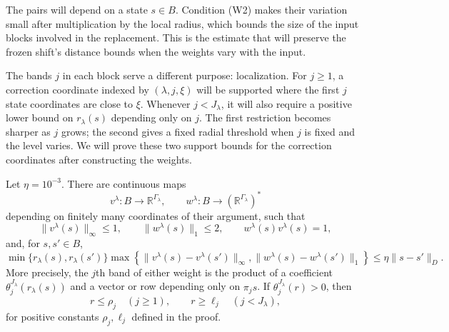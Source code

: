 The pairs will depend on a state $s\in B$. Condition (W2) makes their
variation small after multiplication by the local radius, which bounds
the size of the input blocks involved in the replacement. This is the
estimate that will preserve the frozen shift's distance bounds when
the weights vary with the input.

The bands $j$ in each block serve a different purpose: localization.
For $j\geq1$, a correction coordinate indexed by $(\lambda,j,\xi)$
will be supported where the first $j$ state coordinates are close to
$\xi$. Whenever $j<J_\lambda$, it will also require a positive lower
bound on $r_\lambda(s)$ depending only on $j$. The first restriction
becomes sharper as $j$ grows; the second gives a fixed radial threshold
when $j$ is fixed and the level varies. We will prove these two support
bounds for the correction coordinates after constructing the weights.

\begin{lemma}\label{lem:coordinate-weights}
Let $\eta=10^{-3}$.  There are continuous maps
\[
 v^\lambda:B\to\mathbb R^{\Gamma_\lambda},\qquad
 w^\lambda:B\to(\mathbb R^{\Gamma_\lambda})^*
\]
depending on finitely many coordinates of their argument, such that
\begin{equation*}
 \|v^\lambda(s)\|_\infty\leq1,\qquad
 \|w^\lambda(s)\|_1\leq2,\qquad
 w^\lambda(s)v^\lambda(s)=1,                         \tag{W1}
\end{equation*}
and, for $s,s'\in B$,
\begin{equation*}
 \min\{r_\lambda(s),r_\lambda(s')\}
 \max\!\left\{\|v^\lambda(s)-v^\lambda(s')\|_\infty,
              \|w^\lambda(s)-w^\lambda(s')\|_1\right\}
 \leq\eta\|s-s'\|_D.                                  \tag{W2}
\end{equation*}
More precisely, the $j$th band of either weight is the product of a
coefficient $\theta_j^{J_\lambda}(r_\lambda(s))$ and a vector or row
depending only on $\pi_j s$.  If $\theta_j^{J_\lambda}(r)>0$, then
\begin{equation}
 r\leq\rho_j\quad(j\geq1),\qquad
 r\geq\ell_j\quad(j<J_\lambda),                       \label{eq:band-support}
\end{equation}
for positive constants $\rho_j,\ell_j$ defined in the proof.
\end{lemma}

